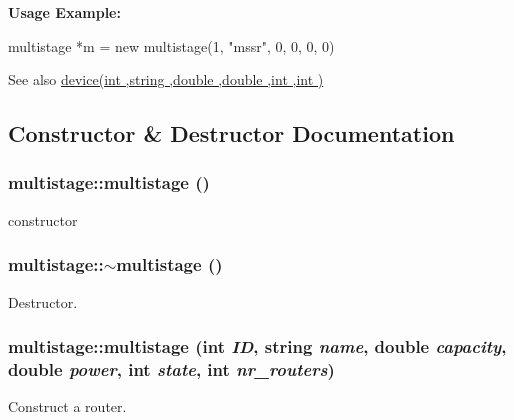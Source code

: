 {\bfseries Usage Example:} 
\begin{DoxyCode}
 multistage *m = new multistage(1, "mssr", 0, 0, 0, 0)
\end{DoxyCode}
 \begin{DoxySeeAlso}{See also}
\hyperlink{classdevice_a57b9c4ac7a8bd970b81b1154ae79a5de}{device(int ,string ,double ,double ,int ,int )} 
\end{DoxySeeAlso}


\subsection{Constructor \& Destructor Documentation}
\hypertarget{classmultistage_abbfa555a8fbdfe7f70efa06fddbaa335}{
\subsubsection[{multistage}]{\setlength{\rightskip}{0pt plus 5cm}multistage::multistage ()}}
\label{classmultistage_abbfa555a8fbdfe7f70efa06fddbaa335}


constructor 

\hypertarget{classmultistage_a3ce104e1cd528efc9f4f2b8b8c2f54a7}{
\subsubsection[{$\sim$multistage}]{\setlength{\rightskip}{0pt plus 5cm}multistage::$\sim$multistage ()}}
\label{classmultistage_a3ce104e1cd528efc9f4f2b8b8c2f54a7}


Destructor. 

\hypertarget{classmultistage_adcbb45a38e0184f037cdc03504dced05}{
\subsubsection[{multistage}]{\setlength{\rightskip}{0pt plus 5cm}multistage::multistage (int {\em ID}, \/  string {\em name}, \/  double {\em capacity}, \/  double {\em power}, \/  int {\em state}, \/  int {\em nr\_\-routers})}}
\label{classmultistage_adcbb45a38e0184f037cdc03504dced05}


Construct a router. 


